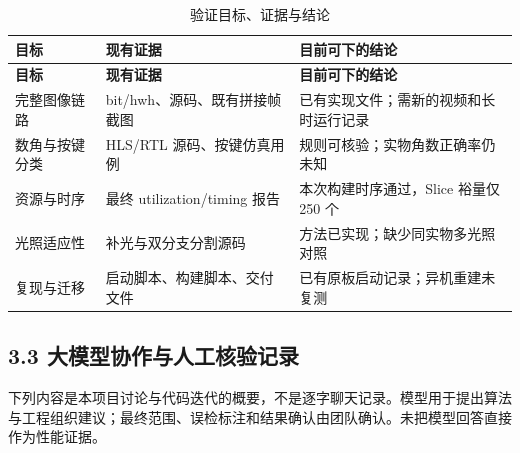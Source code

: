 \documentclass[UTF8,fontset=windows,a4paper,11pt]{ctexart}
\begin{document}
\begin{center}
\begingroup
\fontsize{8.5}{11}\selectfont
\setlength{\tabcolsep}{3pt}
\renewcommand{\arraystretch}{1.22}
\begin{longtable}{@{}p{3.214cm}p{5.293cm}p{5.293cm}@{}}
\caption{验证目标、证据与结论}\\
\toprule
\textbf{目标} & \textbf{现有证据} & \textbf{目前可下的结论} \\
\midrule
\endfirsthead
\toprule
\textbf{目标} & \textbf{现有证据} & \textbf{目前可下的结论} \\
\midrule
\endhead
\bottomrule
\endfoot
完整图像链路 & bit/hwh、源码、既有拼接帧截图 & 已有实现文件；需新的视频和长时运行记录 \\
数角与按键分类 & HLS/RTL 源码、按键仿真用例 & 规则可核验；实物角数正确率仍未知 \\
资源与时序 & 最终 utilization/timing 报告 & 本次构建时序通过，Slice 裕量仅 250 个 \\
光照适应性 & 补光与双分支分割源码 & 方法已实现；缺少同实物多光照对照 \\
复现与迁移 & 启动脚本、构建脚本、交付文件 & 已有原板启动记录；异机重建未复测 \\
\end{longtable}
\endgroup
\end{center}

\subsection*{3.3 大模型协作与人工核验记录}

下列内容是本项目讨论与代码迭代的概要，不是逐字聊天记录。模型用于提出算法与工程组织建议；最终范围、误检标注和结果确认由团队确认。未把模型回答直接作为性能证据。\par
\end{document}
